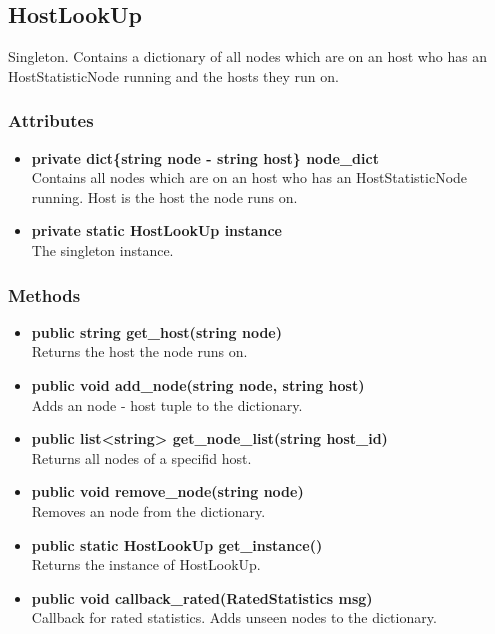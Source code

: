 \subsection{HostLookUp}
Singleton. Contains a dictionary of all nodes which are on an host who has an HostStatisticNode running and the hosts they run on.
\subsubsection{Attributes}
\begin{itemize}
	\item \textbf{ private dict\{string node - string host\} node\_dict }\\
		Contains all nodes which are on an host who has an HostStatisticNode running. Host is the host the node runs on.
	\item \textbf{ private static HostLookUp instance }\\
		The singleton instance.
\end{itemize}
\subsubsection{Methods}
\begin{itemize}
	\item \textbf{ public string get\_host(string node) }\\
		Returns the host the node runs on.
	\item \textbf{ public void add\_node(string node, string host) }\\
		Adds an node - host tuple to the dictionary.
	\item \textbf{ public list<string> get\_node\_list(string host\_id) }\\
		Returns all nodes of a specifid host.
	\item \textbf{ public void remove\_node(string node) }\\
		Removes an node from the dictionary.
	\item \textbf{ public static HostLookUp get\_instance() }\\
		Returns the instance of HostLookUp.
	\item \textbf{ public void callback\_rated(RatedStatistics msg)}\\
		Callback for rated statistics. Adds unseen nodes to the dictionary.
\end{itemize}